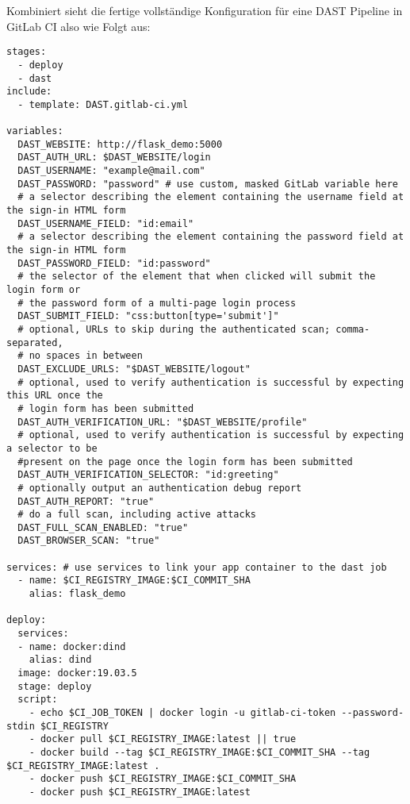Kombiniert sieht die fertige vollständige Konfiguration für eine DAST Pipeline in GitLab CI also wie Folgt aus:
\begin{verbatim}
stages:
  - deploy
  - dast
include:
  - template: DAST.gitlab-ci.yml

variables:
  DAST_WEBSITE: http://flask_demo:5000
  DAST_AUTH_URL: $DAST_WEBSITE/login
  DAST_USERNAME: "example@mail.com"
  DAST_PASSWORD: "password" # use custom, masked GitLab variable here
  # a selector describing the element containing the username field at the sign-in HTML form
  DAST_USERNAME_FIELD: "id:email"
  # a selector describing the element containing the password field at the sign-in HTML form
  DAST_PASSWORD_FIELD: "id:password"
  # the selector of the element that when clicked will submit the login form or
  # the password form of a multi-page login process
  DAST_SUBMIT_FIELD: "css:button[type='submit']"
  # optional, URLs to skip during the authenticated scan; comma-separated,
  # no spaces in between
  DAST_EXCLUDE_URLS: "$DAST_WEBSITE/logout"
  # optional, used to verify authentication is successful by expecting this URL once the
  # login form has been submitted
  DAST_AUTH_VERIFICATION_URL: "$DAST_WEBSITE/profile"
  # optional, used to verify authentication is successful by expecting a selector to be
  #present on the page once the login form has been submitted
  DAST_AUTH_VERIFICATION_SELECTOR: "id:greeting"
  # optionally output an authentication debug report
  DAST_AUTH_REPORT: "true"
  # do a full scan, including active attacks
  DAST_FULL_SCAN_ENABLED: "true"
  DAST_BROWSER_SCAN: "true"

services: # use services to link your app container to the dast job
  - name: $CI_REGISTRY_IMAGE:$CI_COMMIT_SHA
    alias: flask_demo

deploy:
  services:
  - name: docker:dind
    alias: dind
  image: docker:19.03.5
  stage: deploy
  script:
    - echo $CI_JOB_TOKEN | docker login -u gitlab-ci-token --password-stdin $CI_REGISTRY
    - docker pull $CI_REGISTRY_IMAGE:latest || true
    - docker build --tag $CI_REGISTRY_IMAGE:$CI_COMMIT_SHA --tag $CI_REGISTRY_IMAGE:latest .
    - docker push $CI_REGISTRY_IMAGE:$CI_COMMIT_SHA
    - docker push $CI_REGISTRY_IMAGE:latest
\end{verbatim}

